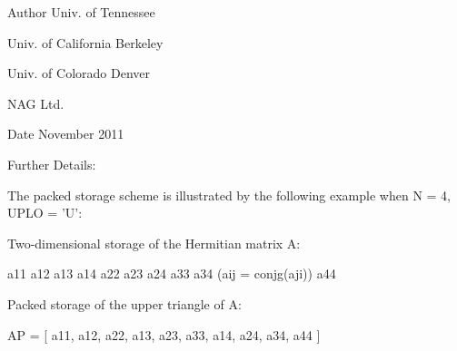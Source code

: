 \begin{DoxyAuthor}{Author}
Univ. of Tennessee 

Univ. of California Berkeley 

Univ. of Colorado Denver 

N\+A\+G Ltd. 
\end{DoxyAuthor}
\begin{DoxyDate}{Date}
November 2011 
\end{DoxyDate}
\begin{DoxyParagraph}{Further Details\+: }
\begin{DoxyVerb}  The packed storage scheme is illustrated by the following example
  when N = 4, UPLO = 'U':

  Two-dimensional storage of the Hermitian matrix A:

     a11 a12 a13 a14
         a22 a23 a24
             a33 a34     (aij = conjg(aji))
                 a44

  Packed storage of the upper triangle of A:

  AP = [ a11, a12, a22, a13, a23, a33, a14, a24, a34, a44 ]\end{DoxyVerb}
 
\end{DoxyParagraph}
